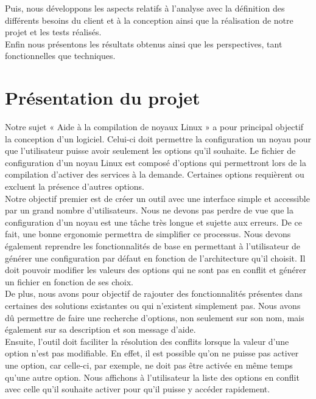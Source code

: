 ﻿\documentclass[17pts]{report}
\begin{document}
Puis, nous développons les aspects relatifs à l’analyse avec la définition des
différents besoins du client et à la conception ainsi que la réalisation de
notre projet et les tests réalisés.  \\

Enfin nous présentons les résultats obtenus ainsi que les perspectives, tant
fonctionnelles que techniques.
\clearpage

\chapter{Présentation du projet}\thispagestyle{IHA-fancy-style}
\label{cha:Présentation du projet}
Notre sujet « Aide à la compilation de noyaux Linux » a pour principal objectif
la conception d'un logiciel. Celui-ci doit permettre la configuration un noyau
pour que l'utilisateur puisse avoir seulement les options qu'il souhaite.  Le
fichier de configuration d'un noyau Linux est composé d'options qui permettront
lors de la compilation d'activer des services à la demande.  Certaines options
requièrent ou excluent la présence d'autres options.  \\

Notre objectif premier est de créer un outil avec une interface simple et
accessible par un grand nombre d'utilisateurs. Nous ne devons pas perdre de vue
que la configuration d'un noyau est une tâche très longue et sujette aux
erreurs. De ce fait, une bonne ergonomie permettra de simplifier ce processus.
Nous devons également reprendre les fonctionnalités de base en permettant à
l'utilisateur de générer une configuration par défaut en fonction de
l'architecture qu'il choisit. Il doit pouvoir modifier les valeurs des options
qui ne sont pas en conflit et générer un fichier en fonction de ses choix.  \\

De plus, nous avons pour objectif de rajouter des fonctionnalités présentes
dans certaines des solutions existantes ou qui n'existent simplement pas.  Nous
avons dû permettre de faire une recherche d'options, non seulement sur son nom,
mais également sur sa description et son message d'aide.  \\

Ensuite, l'outil doit faciliter la résolution des conflits lorsque la valeur
d'une option n'est pas modifiable. En effet, il est possible qu'on ne puisse
pas activer une option, car celle-ci, par exemple, ne doit pas être activée en
même temps qu'une autre option. Nous affichons à l'utilisateur la liste des
options en conflit avec celle qu'il souhaite activer pour qu'il puisse y
accéder rapidement.  \\
\end{document}
